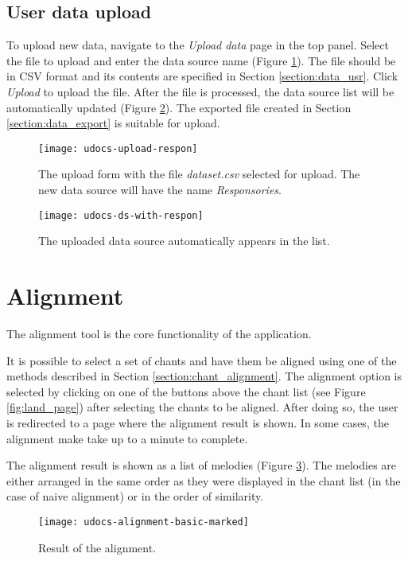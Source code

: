 \subsection{User data upload}

To upload new data, navigate to the \emph{Upload data} page in the top panel. Select the file to upload and enter the data source name (Figure \ref{fig:upload-ds}). The file should be
in CSV format and its contents are specified in Section \ref{section:data_usr}. Click \emph{Upload} to upload the file. After the file is processed, the data source list will
be automatically updated (Figure \ref{fig:update-ds-respon}). The exported file created in Section \ref{section:data_export} is suitable for upload.

\begin{figure}[!h]
\centering
\texttt{[image: udocs-upload-respon]}
\caption{The upload form with the file \emph{dataset.csv} selected for upload. The new data source will have the name \emph{Responsories}.}
\label{fig:upload-ds}
\end{figure}

\begin{figure}[!h]
\centering
\texttt{[image: udocs-ds-with-respon]}
\caption{The uploaded data source automatically appears in the list.}
\label{fig:update-ds-respon}
\end{figure}

\section{Alignment}

The alignment tool is the core functionality of the application.

It is possible to select a set of chants and have them be aligned using one of the methods described in Section \ref{section:chant_alignment}. The alignment option is selected by clicking
on one of the buttons above the chant list (see Figure \ref{fig:land_page}) after selecting the chants to be aligned. After doing so, the user is redirected to a page where the alignment result
is shown. In some cases, the alignment make take up to a minute to complete.

The alignment result is shown as a list of melodies (Figure \ref{fig:align-result}). The melodies are either arranged in the same order as they were displayed in the chant list (in the case of
naive alignment) or in the order of similarity.

\begin{figure}[!h]
\centering
\texttt{[image: udocs-alignment-basic-marked]}
\caption{Result of the alignment.}
\label{fig:align-result}
\end{figure}

